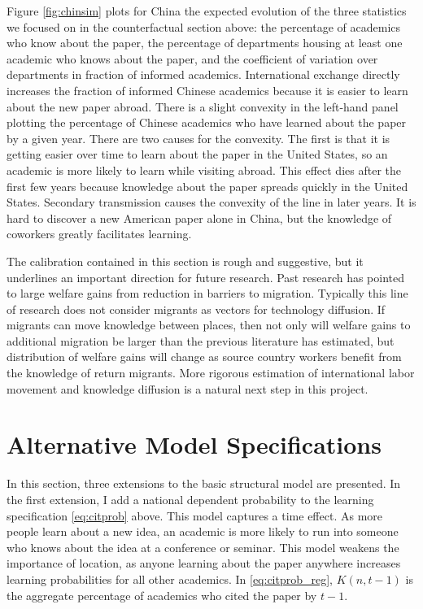 Figure \ref{fig:chinsim} plots for China the expected evolution of the three 
statistics we focused on in the counterfactual section above: the percentage of academics
who know about the paper, the percentage of departments housing at least one academic 
who knows about the paper, and the coefficient of variation over departments in fraction 
of informed academics.  International exchange
 directly increases the fraction of informed Chinese academics because it is
 easier to learn about the new paper abroad.  There is a slight convexity in the 
left-hand panel plotting the percentage of Chinese academics who have learned about
the paper by a given year.
There are two causes for the convexity.  The first is that it is getting easier 
over time to learn about the paper in the United States, so an academic is more likely
to learn while visiting abroad.  This effect dies after the first few years because
knowledge about the paper spreads quickly in the United States.  Secondary transmission
causes the convexity of the line in later years.  It is hard
to discover a new American paper alone in China, but the knowledge of coworkers greatly
facilitates learning.

The calibration contained in this section is rough and suggestive, but it underlines an important
 direction for future research.  Past research has pointed to large welfare gains from
reduction in barriers to migration.\citep{clemens2011economics}  Typically this
 line of research does not consider migrants as vectors for technology diffusion.  If migrants 
can move knowledge between places, then not only will welfare gains to additional
migration be larger than the previous literature has estimated, but distribution of welfare gains 
will change as source country workers benefit from the knowledge
of return migrants.  More rigorous estimation of international labor movement and
 knowledge diffusion is a natural next step in this project.

\section{Alternative Model Specifications}
\label{sec:extensions}

In this section, three extensions to the basic structural model are
presented. In the first extension, I add a national dependent probability
to the learning specification \eqref{eq:citprob} above. This model
captures a time effect.  As more people learn about a new idea, an academic is more likely to run into
someone who knows about the idea at a conference or seminar. This model weakens the importance of location,
as anyone learning about the paper anywhere increases learning probabilities for all other academics.  In
\eqref{eq:citprob_reg}, $K(n,t-1)$ is the aggregate percentage of academics who cited the paper by $t-1$.

